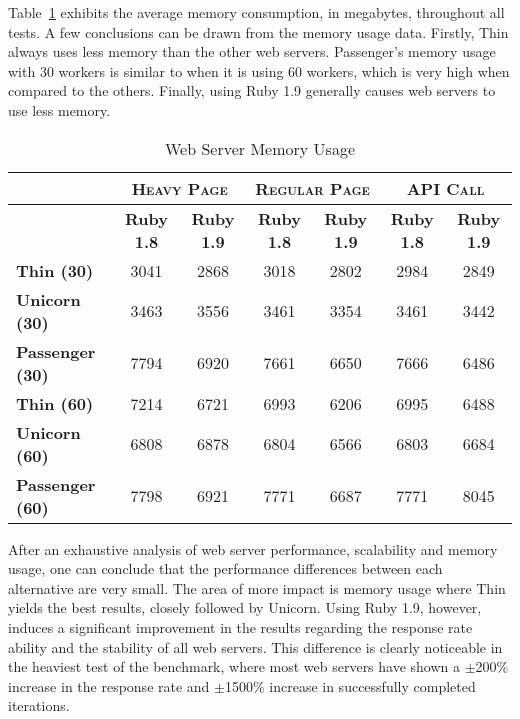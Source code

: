 Table~\ref{tab:web_server_memory_usage} exhibits the average memory consumption, in megabytes, throughout all tests. A few conclusions can be drawn from the memory usage data. Firstly, Thin always uses less memory than the other web servers. Passenger's memory usage with 30 workers is similar to when it is using 60 workers, which is very high when compared to the others. Finally, using Ruby 1.9 generally causes web servers to use less memory.
\begin{table}[h!t]
  \centering
  \caption{Web Server Memory Usage}
  \label{tab:web_server_memory_usage}
  
  \begin{tabular}{l|c|c|c|c|c|c}

     & \multicolumn{2}{c|}{\textbf{\textsc{Heavy Page}}} & \multicolumn{2}{c|}{\textbf{\textsc{Regular Page}}} & \multicolumn{2}{c}{\textbf{\textsc{API Call}}} \\ \hline
     & \textbf{Ruby 1.8} & \textbf{Ruby 1.9} & \textbf{Ruby 1.8} & \textbf{Ruby 1.9} & \textbf{Ruby 1.8} & \textbf{Ruby 1.9} \\ \hline
    \textbf{Thin (30)} & 3041 & 2868 & 3018 & 2802 & 2984 & 2849 \\ \hline
    \textbf{Unicorn (30)} & 3463 & 3556 & 3461 & 3354 & 3461 & 3442 \\ \hline
    \textbf{Passenger (30)} & 7794 & 6920 & 7661 & 6650 & 7666 & 6486 \\ \hline
    \textbf{Thin (60)} & 7214 & 6721 & 6993 & 6206 & 6995 & 6488 \\ \hline
    \textbf{Unicorn (60)} & 6808 & 6878 & 6804 & 6566 & 6803 & 6684 \\ \hline
    \textbf{Passenger (60)} & 7798 & 6921 & 7771 & 6687 & 7771 & 8045 \\
  \end{tabular}
\end{table}

After an exhaustive analysis of web server performance, scalability and memory usage, one can conclude that the performance differences between each alternative are very small. The area of more impact is memory usage where Thin yields the best results, closely followed by Unicorn. Using Ruby 1.9, however, induces a significant improvement in the results regarding the response rate ability and the stability of all web servers. This difference is clearly noticeable in the heaviest test of the benchmark, where most web servers have shown a $\pm$200\% increase in the response rate and $\pm$1500\% increase in successfully completed iterations.

